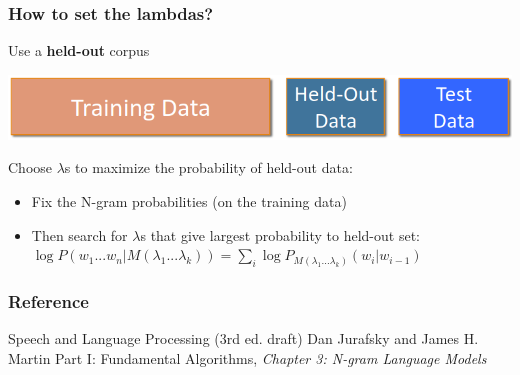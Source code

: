 \documentclass[13.5pt,aspecratio=169]{beamer}
\begin{document}

\begin{frame}
    \onehalfspacing
        \frametitle{How to set the lambdas?}
        {\Large Use a \textbf{held-out} corpus}
        \begin{minipage}{0.75\textwidth}
           \centering
           \includegraphics[scale=0.5]{held_out_corpus.png}
        \end{minipage}

        \vspace{3em}
        \begin{block}{Choose $\lambda$s to maximize the probability of held-out data:}
        \begin{itemize}
            \item Fix the N-gram probabilities (on the training data)
            \item Then search for $\lambda$s that give largest probability to held-out set: \\ \vspace{1em}
            \hspace{1.5em} $ \log{P(w_1 ... w_n | M(\lambda_1 ... \lambda_k))} = \sum_{i} \log{P_{M(\lambda_1 ... \lambda_k)} (w_i | w_{i-1})} $
        \end{itemize}
        \end{block}
    
       
    \end{frame}
    





\onehalfspacing
\begin{frame} %
	\frametitle{Reference}
	
	\begin{thebibliography}{99} %
		\footnotesize %
		
			Speech and Language Processing (3rd ed. draft)
			\newblock Dan Jurafsky and James H. Martin
			\newblock Part I: Fundamental Algorithms, \emph{Chapter 3: N-gram Language Models	}
			
		
	\end{thebibliography}
\end{frame}
\end{document}
